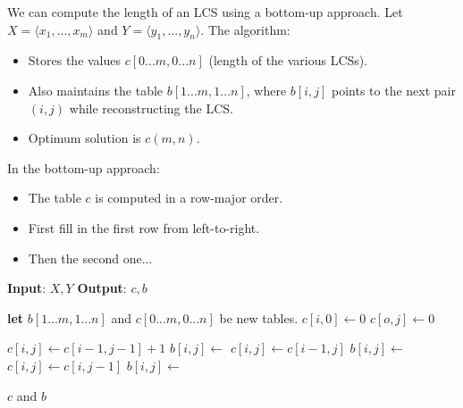 We can compute the length of an LCS using a bottom-up approach.
Let \(X = \langle x_1, ..., x_m \rangle\) and \(Y = \langle y_1, ..., y_n \rangle\).
The algorithm:
\begin{itemize}
    \item Stores the values \(c[0...m, 0...n]\) (length of the various LCSs).
    \item Also maintains the table \(b[1...m,1...n]\), where \(b[i,j]\) points to the next pair \((i,j)\) while reconstructing the LCS.
    \item Optimum solution is \(c(m,n)\).
\end{itemize}
In the bottom-up approach:
\begin{itemize}
    \item The table \(c\) is computed in a row-major order.
    \item First fill in the first row from left-to-right.
    \item Then the second one...
\end{itemize}

\begin{algorithm}[H]
    \caption{LCS(\(X,Y\))}
    \begin{algorithmic}
        \State \textbf{Input}: \(X,Y\)
        \State \textbf{Output}: \(c,b\)
        
        \State \textbf{let} \(b[1...m, 1...n]\) and \(c[0...m, 0...n]\) be new tables.
            \State \(c[i,0] \gets 0\)
        \EndFor
            \State \(c[o,j] \gets 0\)
        \EndFor
        
                    \State \(c[i,j] \gets c[i-1, j-1] + 1\)
                    \State \(b[i,j] \gets\) \say{\(\nwarrow\)}
                    \State \(c[i,j] \gets c[i-1, j]\)
                    \State \(b[i,j] \gets\) \say{\(\uparrow\)}
                \Else
                    \State \(c[i,j] \gets c[i, j-1]\)
                    \State \(b[i,j] \gets\) \say{\(\leftarrow\)}
                \EndIf
            \EndFor
        \EndFor

        \noindent\Return \(c\) and \(b\)
    \end{algorithmic}
    \label{alg:lcs}
\end{algorithm}

